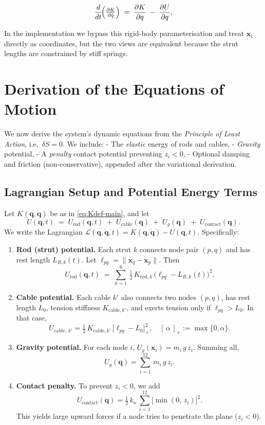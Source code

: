 \documentclass[12pt,letterpaper]{article}
\newcommand{\q}{\bm{q}}
\newcommand{\qd}{\dot{\bm{q}}}
\newcommand{\x}{\bm{x}}
\newcommand{\Lag}{\mathcal{L}}
\begin{document}
\begin{equation}
  \frac{d}{dt}\!\Bigl(\tfrac{\partial K}{\partial\dot q}\Bigr)
  \;=\;
  \frac{\partial K}{\partial q}
  \;-\;
  \frac{\partial U}{\partial q},
  \label{eq:EL-general}
\end{equation}

In the implementation we bypass this rigid‑body
parameterisation and treat $\x_i$ directly as coordinates, but the two views are
equivalent because the strut lengths are constrained by stiff springs.

\section{Derivation of the Equations of Motion}
\label{sec:derivation}
We now derive the system's dynamic equations from the \emph{Principle of Least Action}, i.e.\ $\delta S=0$. We include:
- The \emph{elastic} energy of rods and cables,
- \emph{Gravity} potential,
- A \emph{penalty} contact potential preventing $z_i<0$,
- Optional damping and friction (non-conservative), appended after the variational derivation.

\subsection{Lagrangian Setup and Potential Energy Terms}
Let $K(\q,\qd)$ be as in \eqref{eq:Kdef-main}, and let
\[
   U(\q,t) \;=\;U_{\text{rod}}(\q,t)\;+\;U_{\text{cable}}(\q)\;+\;U_g(\q)\;+\;U_{\mathrm{contact}}(\q).
\]
We write the Lagrangian $\Lag(\q,\qd,t) = K(\q,\qd) - U(\q,t)$. Specifically:

\begin{enumerate}[leftmargin=1.8em,label=(\roman*)]
  \item \textbf{Rod (strut) potential.}
    Each strut $k$ connects node pair $(p,q)$ and has rest length $L_{R,k}(t)$.
    Let $\ell_{pq} = \|\x_q - \x_p\|$.
    Then
    \[
      U_{\text{rod}}(\q,t)
        \;=\;\sum_{k=1}^{6} \,\tfrac12\,K_{\text{rod},k}\,\bigl(\ell_{pq}-L_{R,k}(t)\bigr)^2.
    \]

  \item \textbf{Cable potential.}
    Each cable $k'$ also connects two nodes $(p,q)$, has rest length $L_0$, tension stiffness $K_{\text{cable},k'}$, and exerts tension only if $\ell_{pq} > L_0$.  In that case,
    \[
      U_{\text{cable},\,k'}=\tfrac12\,K_{\text{cable},k'}\,\bigl[\ell_{pq}-L_0\bigr]^2_{\!+},
      \quad [\,\alpha\,]_+ := \max\{0,\alpha\}.
    \]

  \item \textbf{Gravity potential.}
    For each node $i$, $U_{g}(\x_i)=m_i\,g\,z_i$. Summing all,
    \[
      U_g(\q)=\sum_{i=1}^{12}\,m_i\,g\,z_i.
    \]

  \item \textbf{Contact penalty.}
    To prevent $z_i<0$, we add
    \[
      U_{\mathrm{contact}}(\q)
        = \tfrac12\,k_{n}\,\sum_{i=1}^{12}\bigl[\min(0,\,z_i)\bigr]^{2}.
    \]
    This yields large upward forces if a node tries to penetrate the plane ($z_i<0$).
\end{enumerate}
\end{document}
